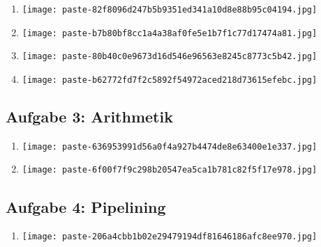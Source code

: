 \documentclass[12pt,a4paper]{article}
\begin{document}
\begin{enumerate}[label=\alph*), topsep=5pt, itemsep=10pt]
\item \mbox{}\begin{center}\texttt{[image: paste-82f8096d247b5b9351ed341a10d8e88b95c04194.jpg]}
\end{center}
\item \mbox{}\begin{center}\texttt{[image: paste-b7b80bf8cc1a4a38af0fe5e1b7f1c77d17474a81.jpg]}
\end{center}
\item \mbox{}\begin{center}\texttt{[image: paste-80b40c0e9673d16d546e96563e8245c8773c5b42.jpg]}
\end{center}
\item \mbox{}\begin{center}\texttt{[image: paste-b62772fd7f2c5892f54972aced218d73615efebc.jpg]}
\end{center}
\end{enumerate}
\clearpage
\subsection*{Aufgabe 3: Arithmetik}

\begin{enumerate}[label=\alph*), topsep=5pt, itemsep=10pt]
\item \mbox{}\begin{center}\texttt{[image: paste-636953991d56a0f4a927b4474de8e63400e1e337.jpg]}
\end{center}
\item \mbox{}\begin{center}\texttt{[image: paste-6f00f7f9c298b20547ea5ca1b781c82f5f17e978.jpg]}
\end{center}
\end{enumerate}
\clearpage
\subsection*{Aufgabe 4: Pipelining}

\begin{enumerate}[label=\alph*), topsep=5pt, itemsep=10pt]
\item \mbox{}\begin{center}\texttt{[image: paste-206a4cbb1b02e29479194df81646186afc8ee970.jpg]}
\end{center}
\end{enumerate}
\clearpage
\end{document}
